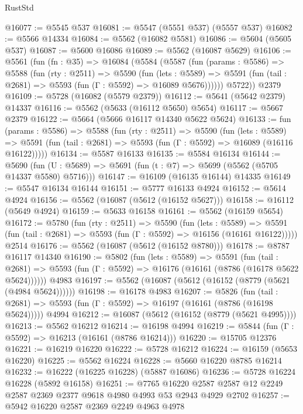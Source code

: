 \begin{lexlean}{RustStd}
\begin{coremodule}
@16077 := @5545 @537
@16081 := @5547 (@5551 @537) (@5557 @537)
@16082 := @5566 @14334
@16084 := @5562 (@16082 @5581)
@16086 := @5604 (@5605 @537)
@16087 := @5600 @16086
@16089 := @5562 (@16087 @5629)
@16106 := @5561
    (fun (fn : @35) =>
    @16084
      (@5584
        (@5587
          (fun (params : @5586) =>
          @5588
            (fun (rty : @2511) =>
            @5590
              (fun (lets : @5589) =>
              @5591 (fun (tail : @2681) => @5593 (fun (Γ : @5592) => @16089 @5676))))))
        @5722))
    @2379
@16109 := @5728 (@16082 (@5579 @2379))
@16112 := @5641 (@5642 @2379) @14337
@16116 := @5562 (@5633 (@16112 @5650) @5654)
@16117 := @5667 @2379
@16122 := @5664 (@5666 @16117 @14340 @5622 @5624)
@16133 := fun (params : @5586) =>
  @5588
    (fun (rty : @2511) =>
    @5590
      (fun (lets : @5589) =>
      @5591 (fun (tail : @2681) => @5593 (fun (Γ : @5592) => @16089 (@16116 @16122)))))
@16134 := @5587 @16133
@16135 := @5584 @16134
@16144 := @5690
    (fun (U : @5689) => @5691 (fun (t : @7) => @5699 (@5562 (@5705 @14337 @5580) @5716)))
@16147 := @16109 (@16135 @16144) @14335
@16149 := @5547 @16134 @16144
@16151 := @5777 @16133 @4924
@16152 := @5614 @4924
@16156 := @5562 (@16087 (@5612 (@16152 @5627)))
@16158 := @16112 (@5649 @4924)
@16159 := @5633 @16158
@16161 := @5562 (@16159 @5654)
@16172 := @5780
    (fun (rty : @2511) =>
    @5590
      (fun (lets : @5589) =>
      @5591 (fun (tail : @2681) => @5593 (fun (Γ : @5592) => @16156 (@16161 @16122)))))
    @2514
@16176 := @5562 (@16087 (@5612 (@16152 @8780)))
@16178 := @8787 @16117 @14340
@16190 := @5802
    (fun (lets : @5589) =>
    @5591
      (fun (tail : @2681) =>
      @5593 (fun (Γ : @5592) => @16176 (@16161 (@8786 (@16178 @5622 @5624))))))
    @4983
@16197 := @5562 (@16087 (@5612 (@16152 (@8779 (@5621 (@4984 @5624))))))
@16198 := @16178 @4983
@16207 := @5826
    (fun (tail : @2681) => @5593 (fun (Γ : @5592) => @16197 (@16161 (@8786 (@16198 @5624)))))
    @4994
@16212 := @16087 (@5612 (@16152 (@8779 (@5621 @4995))))
@16213 := @5562 @16212
@16214 := @16198 @4994
@16219 := @5844 (fun (Γ : @5592) => @16213 (@16161 (@8786 @16214)))
@16220 := @15705 @12376
@16221 := @16219 @16220
@16222 := @5728 @16212
@16224 := @16159 (@5653 @16220)
@16225 := @5562 @16224
@16228 := @5660 @16220 @8785 @16214
@16232 := @16222 (@16225 @16228) (@5887 @16086)
@16236 := @5728 @16224 @16228 (@5892 @16158)
@16251 := @7765
    @16220
    @2587
    @2587
    @12
    @2249
    @2587
    @2369
    @2377
    @9618
    @4980
    @4993
    @53
    @2943
    @4929
    @2702
@16257 := @5942 @16220 @2587 @2369 @2249 @4963 @4978

\end{coremodule}
\end{lexlean}
